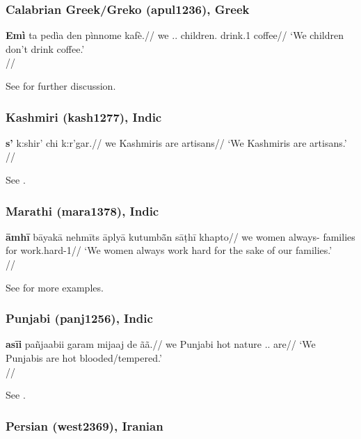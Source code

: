 \subsubsection{Calabrian Greek/Greko (apul1236), Greek}

\ex
\begingl
\gla \textbf{Emì} ta pedìa den pìnnome kafè.//
\glb we \Det.\N.\Pl{} children.\N{} \Neg{} drink.1\Pl{} coffee//
\glft `We children don't drink coffee.'\\\citep[after][274, (17)]{hoehnetalICGLcalabria}//
\endgl
\xe

See \citet{hoehnetalICGLcalabria} for further discussion.

\subsubsection{Kashmiri (kash1277), Indic}

\ex 
\begingl
\gla \textbf{\textschwa{}s'} k\textschwa{}:shir' chi k\textschwa{}:r'gar.//
\glb we Kashmiris are artisans//
\glft `We Kashmiris are artisans.'\\\citep[200, (8)]{walikoul1997}//
\endgl
\xe

See \citet[200]{walikoul1997}.

\subsubsection{Marathi (mara1378), Indic}

\ex \begingl
\gla \textbf{\={a}mh\={i}} b\={a}yak\={a} nehm\={i}ts \={a}ply\={a} kutumb\={ã}n s\={a}\d{t}h\={i} khapto//
\glb we women always-\Emph{} \Refl{} families for {work.hard-1\Pl}//
\glft `We women always work hard for the sake of our families.'\\\citep[386, (1141)]{pandharipande1997}//
\endgl
\xe

See \citet[381, 386]{pandharipande1997} for more examples.


\subsubsection{Punjabi (panj1256), Indic}

\ex
\begingl
\gla \textbf{as\={ii}} pañjaabii garam mijaaj de ãã.//
\glb we Punjabi hot nature \Gen.\M.\Pl{} are//
\glft `We Punjabis are hot blooded/tempered.'\\\citep[228, (703)]{bhatia1993}//
\endgl
\xe

See \citet[228]{bhatia1993}.

\subsubsection{Persian (west2369), Iranian}

